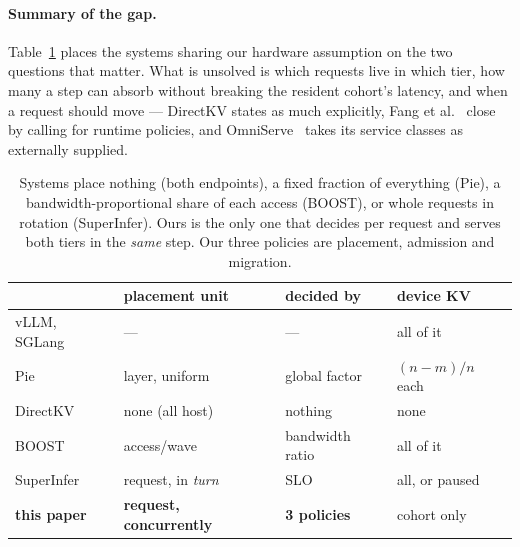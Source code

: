 \paragraph{Summary of the gap.} Table~\ref{tab:axes} places the systems sharing our
hardware assumption on the two questions that matter. What is unsolved is which
requests live in which tier, how many a step can absorb without breaking the resident
cohort's latency, and when a request should move --- DirectKV states as much
explicitly, Fang et al.~\cite{calkv} close by calling for runtime policies, and
OmniServe~\cite{omniserve} takes its service classes as externally supplied.

\begin{table}[t]
\centering
\footnotesize
\setlength{\tabcolsep}{4pt}
\begin{tabular}{@{}llll@{}}
\toprule
 & placement unit & decided by & device KV \\
\midrule
vLLM, SGLang & --- & --- & all of it \\
Pie~\cite{pie} & layer, uniform & global factor & $(n{-}m)/n$ each \\
DirectKV~\cite{directkv} & none (all host) & nothing & none \\
BOOST~\cite{boost} & access/wave & bandwidth ratio & all of it \\
SuperInfer~\cite{superinfer} & request, in \emph{turn} & SLO & all, or paused \\
\textbf{this paper} & \textbf{request, concurrently} & \textbf{3 policies} & cohort only \\
\bottomrule
\end{tabular}
\caption{Systems place nothing (both endpoints), a fixed fraction of everything
(Pie), a bandwidth-proportional share of each access (BOOST), or whole requests in
rotation (SuperInfer). Ours is the only one that decides per request and serves
both tiers in the \emph{same} step. Our three policies are placement, admission
and migration.}
\label{tab:axes}
\end{table}
